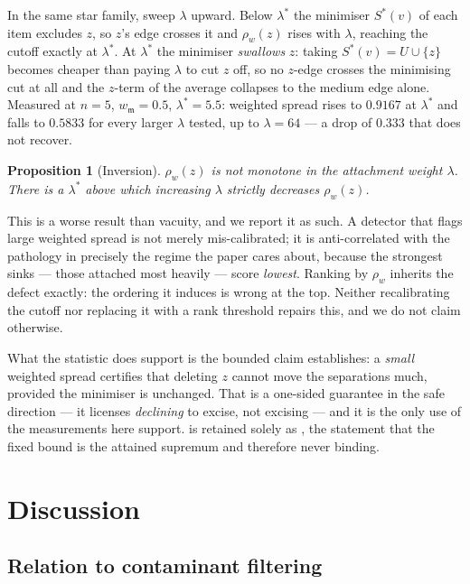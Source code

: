 \documentclass[11pt,a4paper]{article}
\newtheorem{proposition}[theorem]{Proposition}
\theoremstyle{definition}
\theoremstyle{remark}
\newcommand{\wt}{w}
\newcommand{\med}{\mathfrak{m}}
\newcommand{\spr}{\rho}                       %
\newcommand{\wm}{w_{\med}}                    %
\begin{document}
In the same star family, sweep $\lambda$ upward. Below $\lambda^*$ the
minimiser $S^*(v)$ of each item excludes $z$, so $z$'s edge crosses it
and $\spr_{\wt}(z)$ rises with $\lambda$, reaching the cutoff exactly at
$\lambda^*$. At $\lambda^*$ the minimiser \emph{swallows} $z$: taking
$S^*(v) = U \cup \{z\}$ becomes cheaper than paying $\lambda$ to cut
$z$ off, so no $z$-edge crosses the minimising cut at all and the
$z$-term of the average collapses to the medium edge alone. Measured at
$n = 5$, $\wm = 0.5$, $\lambda^* = 5.5$: weighted spread rises to
$0.9167$ at $\lambda^*$ and falls to $0.5833$ for every larger
$\lambda$ tested, up to $\lambda = 64$ --- a drop of $0.333$ that does
not recover.

\begin{proposition}[Inversion]\label{prop:inversion}
$\spr_{\wt}(z)$ is not monotone in the attachment weight $\lambda$.
There is a $\lambda^*$ above which increasing $\lambda$ strictly
decreases $\spr_{\wt}(z)$.
\end{proposition}

This is a worse result than vacuity, and we report it as such. A
detector that flags large weighted spread is not merely mis-calibrated;
it is anti-correlated with the pathology in precisely the regime the
paper cares about, because the strongest sinks --- those attached most
heavily --- score \emph{lowest}. Ranking by $\spr_{\wt}$ inherits the
defect exactly: the ordering it induces is wrong at the top. Neither
recalibrating the cutoff nor replacing it with a rank threshold repairs
this, and we do not claim otherwise.

What the statistic does support is the bounded claim
 establishes: a \emph{small} weighted
spread certifies that deleting $z$ cannot move the separations much,
provided the minimiser is unchanged. That is a one-sided guarantee in
the safe direction --- it licenses \emph{declining} to excise, not
excising --- and it is the only use of  the
measurements here support.  is retained solely as
, the statement that the fixed bound is the
attained supremum and therefore never binding.

\section{Discussion}
\label{sec:discussion}

\subsection{Relation to contaminant filtering}
\end{document}

